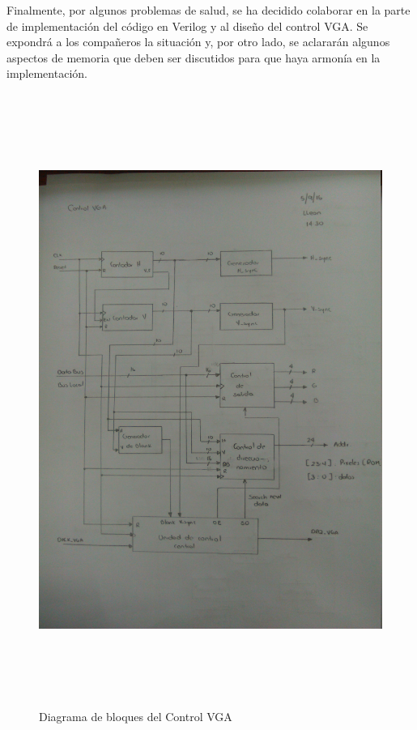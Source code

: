 \documentclass[12pt,a4paper]{report}
\begin{document}
Finalmente, por algunos problemas de salud, se ha decidido colaborar en la parte de implementación del código en Verilog y al diseño del control VGA. Se expondrá a los compañeros la situación y, por otro lado, se aclararán algunos aspectos de memoria que deben ser discutidos para que haya armonía en la implementación.

\begin{figure}[hbtp]
	\centering
	\includegraphics[width=16cm,height=20cm]{Img/ControlVGABloques.jpg}
	\caption{Diagrama de bloques del Control VGA}
	\label{fig:BloquesVGA1}
\end{figure}
\end{document}
